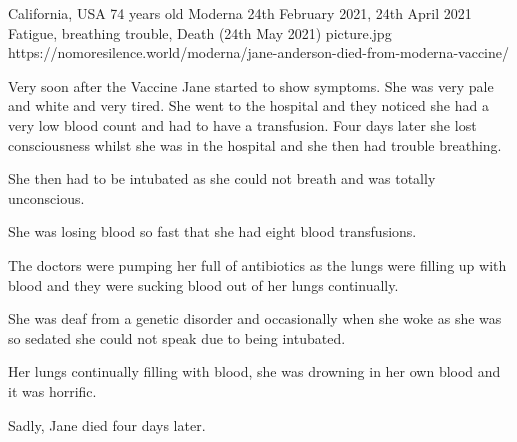 {California, USA}
{74 years old}
{Moderna}
{24th February 2021, 24th April 2021}
{Fatigue, breathing trouble, Death (24th May 2021)}
{picture.jpg}
{https://nomoresilence.world/moderna/jane-anderson-died-from-moderna-vaccine/}
{

Very soon after the Vaccine Jane started to show symptoms. She was very pale and
white and very tired. She went to the hospital and they noticed she had a very
low blood count and had to have a transfusion. Four days later she lost
consciousness whilst she was in the hospital and she then had trouble breathing.

She then had to be intubated as she could not breath and was totally unconscious.

She was losing blood so fast that she had eight blood transfusions.

The doctors were pumping her full of antibiotics as the lungs were filling up
with blood and they were sucking blood out of her lungs continually.

She was deaf from a genetic disorder and occasionally when she woke as she was
so sedated she could not speak due to being intubated.

Her lungs continually filling with blood, she was drowning in her own blood and
it was horrific.

Sadly, Jane died four days later.

}
